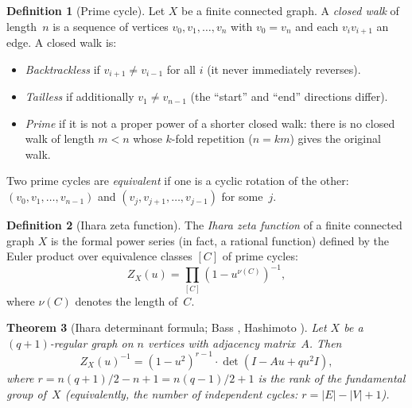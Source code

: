 \documentclass[11pt,a4paper]{article}
\theoremstyle{plain}
\newtheorem{theorem}{Theorem}[section]
\theoremstyle{definition}
\newtheorem{definition}[theorem]{Definition}
\begin{document}
\begin{tcolorbox}[breakable, colback=green!8, colframe=green!8,
  boxrule=0pt, sharp corners]
\begin{definition}[Prime cycle]
\label{def:prime-cycle}
Let $X$ be a finite connected graph. A \emph{closed walk} of
length~$n$ is a sequence of vertices $v_0, v_1, \ldots, v_n$ with
$v_0 = v_n$ and each $v_i v_{i+1}$ an edge. A closed walk is:
\begin{itemize}
\item \emph{Backtrackless} if $v_{i+1} \neq v_{i-1}$ for all $i$
  (it never immediately reverses).
\item \emph{Tailless} if additionally $v_1 \neq v_{n-1}$ (the
  ``start'' and ``end'' directions differ).
\item \emph{Prime} if it is not a proper power of a shorter closed
  walk: there is no closed walk of length $m < n$ whose $k$-fold
  repetition ($n = km$) gives the original walk.
\end{itemize}
Two prime cycles are \emph{equivalent} if one is a cyclic rotation
of the other: $(v_0, v_1, \ldots, v_{n-1})$ and
$(v_j, v_{j+1}, \ldots, v_{j-1})$ for some~$j$.
\end{definition}
\end{tcolorbox}

\begin{tcolorbox}[breakable, colback=green!8, colframe=green!8,
  boxrule=0pt, sharp corners]
\begin{definition}[Ihara zeta function]
\label{def:ihara}
The \emph{Ihara zeta function} of a finite connected graph $X$ is the
formal power series (in fact, a rational function) defined by the
Euler product over equivalence classes $[C]$ of prime cycles:
\begin{equation}
\label{eq:ihara-euler}
  Z_X(u) = \prod_{[C]} \left(1 - u^{\nu(C)}\right)^{-1},
\end{equation}
where $\nu(C)$ denotes the length of~$C$.
\end{definition}
\end{tcolorbox}

\begin{tcolorbox}[breakable, colback=black!5, colframe=black!5,
  boxrule=0pt, sharp corners]
\begin{theorem}[Ihara determinant formula; Bass \cite{Bass1992},
Hashimoto \cite{Hashimoto1989}]
\label{thm:ihara-det}
Let $X$ be a $(q+1)$-regular graph on $n$ vertices with adjacency
matrix~$A$. Then
\begin{equation}
\label{eq:ihara-det}
  Z_X(u)^{-1}
  = (1 - u^2)^{r-1} \cdot \det\!\left(I - Au + qu^2 I\right),
\end{equation}
where $r = n(q+1)/2 - n + 1 = n(q-1)/2 + 1$ is the rank of the
fundamental group of~$X$ (equivalently, the number of independent
cycles: $r = |E| - |V| + 1$).
\end{theorem}
\end{tcolorbox}
\end{document}
